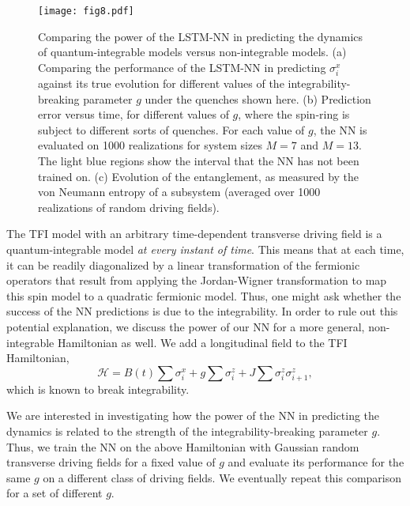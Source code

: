 \documentclass[a4paper,aps,amsmath,amssymb,twocolumn,longbibliography,,accepted=2022-05-17]{quantumarticle}
\begin{document}
\begin{figure*}[]
	\centering
	\texttt{[image: fig8.pdf]}
	\caption{
		Comparing the power of the LSTM-NN in predicting the dynamics of quantum-integrable models versus non-integrable models.
		(a) Comparing the performance of the LSTM-NN in predicting $\sigma_{i}^{x}$ against its true evolution for different values of the integrability-breaking parameter $g$ under the quenches shown here. 
		(b) Prediction error versus time, for different values of $g$, where the spin-ring is subject to different sorts of quenches. For each value of $g$, the NN is evaluated on 1000 realizations for system sizes $M=7$ and $M=13$. The light blue regions show the interval that the NN has not been trained on. (c) Evolution of the entanglement, as measured by the von Neumann entropy of a subsystem (averaged over 1000 realizations of random driving fields).
	}
	\label{fig8}
\end{figure*}

The TFI model with an arbitrary time-dependent transverse driving field is a quantum-integrable model \textit{at every instant of time}. This means that at each time, it can be readily diagonalized by a linear transformation of the fermionic operators that result from applying the Jordan-Wigner transformation \cite{mbeng2020quantum} to map this spin model to a quadratic fermionic model. Thus, one might ask whether the success of the NN predictions is due to the integrability. In order to rule out this potential explanation, we discuss the power of our NN for a more general, non-integrable Hamiltonian as well. We add a longitudinal field to the TFI Hamiltonian,
\begin{equation}
	\mathcal{H}=B(t)\sum \sigma_{i}^{x}+g \sum \sigma_{i}^{z}+J \sum \sigma_{i}^{z} \sigma_{i+1}^{z},\label{noninteg}
\end{equation}
which is known to break integrability.

We are interested in investigating how the power of the NN in predicting the dynamics is related to the strength of the integrability-breaking parameter $g$. Thus, we train the NN on the above Hamiltonian with  Gaussian random transverse driving fields for a fixed value of $g$ and evaluate its performance for the same $g$ on a different class of driving fields. We eventually repeat this comparison for a set of different $g$.

\end{document}
